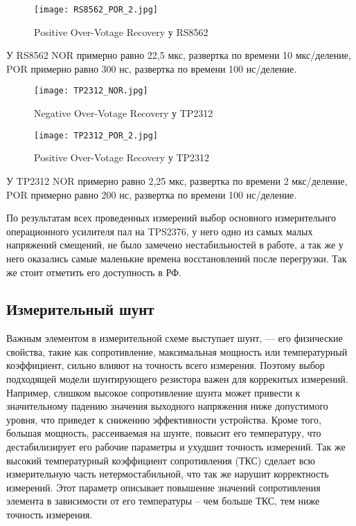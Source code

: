 \begin{figure}[H]
\centering
\texttt{[image: RS8562\_POR\_2.jpg]}
\caption{Positive Over-Votage Recovery у RS8562}
\label{ris:424}
\end{figure}

У RS8562 NOR примерно равно 22,5 мкс, развертка по времени 10 мкс/деление, 
POR примерно равно 300 нс, развертка по времени 100 нс/деление.

\begin{figure}[H]
\centering
\texttt{[image: TP2312\_NOR.jpg]}
\caption{Negative Over-Votage Recovery у TP2312}
\label{ris:425}
\end{figure}

\begin{figure}[H]
\centering
\texttt{[image: TP2312\_POR\_2.jpg]}
\caption{Positive Over-Votage Recovery у TP2312}
\label{ris:426}
\end{figure}

У TP2312 NOR примерно равно 2,25 мкс, развертка по времени 2 мкс/деление, 
POR примерно равно 200 нс, развертка по времени 100 нс/деление.

По результатам всех проведенных измерений выбор основного измерительнго операционного усилителя пал на 
TPS2376, у него одно из самых малых напряжений смещений, не было замечено нестабильностей в работе, 
а так же у него оказались самые маленькие времена восстановлений после перегрузки. Так же стоит отметить 
его доступность в РФ.

\subsection{Измерительный шунт}
\hspace{1cm} 

Важным элементом в измерительной схеме выступает шунт, — его физические свойства, 
такие как сопротивление, максимальная мощность или температурный коэффициент, 
сильно влияют на точность всего измерения. Поэтому выбор подходящей модели шунтирующего резистора 
важен для коррекнтых измерений. Например, слишком высокое сопротивление шунта может привести к 
значительному падению значения выходного напряжения ниже допустимого уровня, что приведет к снижению 
эффективности устройства. Кроме того, большая мощность, рассеиваемая на шунте, повысит его температуру, 
что дестабилизирует его рабочие параметры и ухудшит точность измерений. Так же высокий температурный 
коэффициент сопротивления (ТКС) сделает всю измерительную часть нетермостабильной, что так же нарушит 
корректность измерений. Этот параметр описывает повышение значений сопротивления элемента в зависимости от
его температуры -- чем больше ТКС, тем ниже точность измерения.

